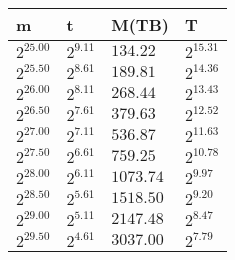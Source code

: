 \begin{tabular}{llll}
m & t & M(TB) & T \\ \hline
$2^{25.00}$ & $2^{9.11}$ & $134.22$ & $2^{15.31}$ \\
$2^{25.50}$ & $2^{8.61}$ & $189.81$ & $2^{14.36}$ \\
$2^{26.00}$ & $2^{8.11}$ & $268.44$ & $2^{13.43}$ \\
$2^{26.50}$ & $2^{7.61}$ & $379.63$ & $2^{12.52}$ \\
$2^{27.00}$ & $2^{7.11}$ & $536.87$ & $2^{11.63}$ \\
$2^{27.50}$ & $2^{6.61}$ & $759.25$ & $2^{10.78}$ \\
$2^{28.00}$ & $2^{6.11}$ & $1073.74$ & $2^{9.97}$ \\
$2^{28.50}$ & $2^{5.61}$ & $1518.50$ & $2^{9.20}$ \\
$2^{29.00}$ & $2^{5.11}$ & $2147.48$ & $2^{8.47}$ \\
$2^{29.50}$ & $2^{4.61}$ & $3037.00$ & $2^{7.79}$ \\
\end{tabular}
